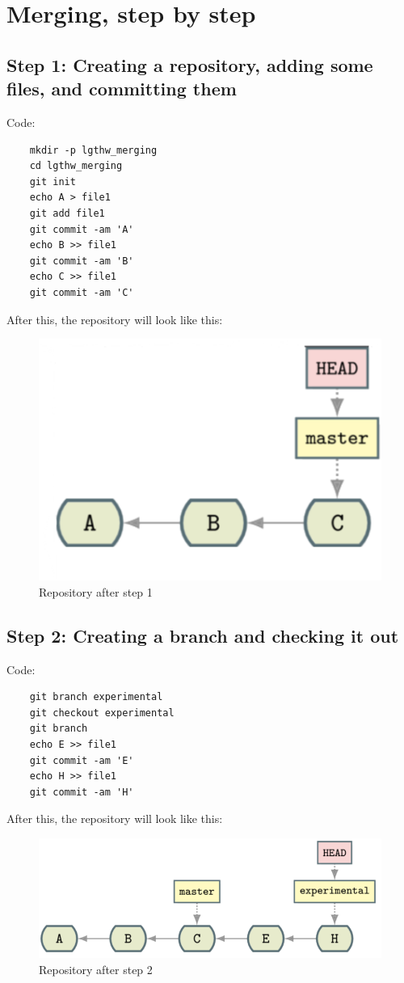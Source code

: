 \documentclass{report}
\begin{document}
\section{Merging, step by step}

\subsection{Step 1: Creating a repository, adding some files, and committing them}

Code:

\begin{lstlisting}
    mkdir -p lgthw_merging
    cd lgthw_merging
    git init
    echo A > file1
    git add file1
    git commit -am 'A'
    echo B >> file1
    git commit -am 'B'
    echo C >> file1
    git commit -am 'C'
\end{lstlisting}

After this, the repository will look like this:

\begin{figure}
    \centering
    \includegraphics[width=0.5 \linewidth]{Photos/merge-3.png}
    \caption[short]{Repository after step 1}
    \label{fig:merge-3}
\end{figure}

\subsection{Step 2: Creating a branch and checking it out}

Code:

\begin{lstlisting}
    git branch experimental
    git checkout experimental
    git branch
    echo E >> file1
    git commit -am 'E'
    echo H >> file1
    git commit -am 'H'
\end{lstlisting}

After this, the repository will look like this:

\begin{figure}[H]
    \centering
    \includegraphics[width=0.5 \linewidth]{Photos/merge-4.png}
    \caption[short]{Repository after step 2}
    \label{fig:merge-4}
\end{figure}
\end{document}
